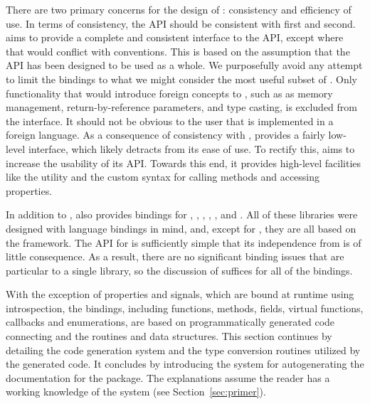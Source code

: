 \documentclass[article,shortnames]{jss}
\begin{document}
There are two primary concerns for the design of :
consistency
and efficiency of use. In terms of consistency, the API should be
consistent 
with  first and  second.  aims to
provide a 
complete and consistent interface to the  API, except where
that would
conflict with  conventions. This is based on the
assumption that the
 API has been designed to be used as a whole. We
purposefully avoid 
any attempt to limit the bindings to what we might consider the most
useful 
subset of . Only functionality that would introduce foreign
concepts
to , such as as memory management, return-by-reference
parameters, 
and type casting, is excluded from the  interface. It
should not be
obvious to the user that  is implemented in a foreign
language.
As a consequence of consistency with ,  provides
a fairly 
low-level interface, which likely detracts from its ease of use. To
rectify
this,  aims to increase the usability of its API. 
Towards this end, it provides high-level facilities like the
 utility and the custom syntax for calling methods
and accessing properties. 

In addition to ,  also provides bindings for
, , , , , and
.  All of these libraries were designed with language
bindings in mind, and, except for , they are all based on
the  framework.  The API for  is sufficiently
simple that its independence from  is of little
consequence. As a result, there are no significant binding issues that
are particular to a single library, so the discussion of 
suffices for all of the bindings.

With the exception of properties and signals, which are bound at
runtime using introspection, the  bindings, including
functions, methods, fields, virtual functions, callbacks and
enumerations, are based on programmatically generated code connecting
 and the  routines and data structures.  This
section continues by
detailing the code
generation system and the type conversion routines utilized by the
generated code. It concludes by introducing the system for
autogenerating the  documentation for the package. The
explanations assume the reader has a working knowledge of
the  system (see Section~\ref{sec:primer}).
\end{document}
